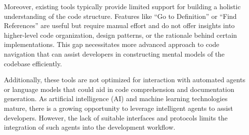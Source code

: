 \documentclass[12pt,oneside]{article}
\begin{document}
Moreover, existing tools typically provide limited support for building a holistic understanding of the code structure.
Features like “Go to Definition” or “Find References” are useful but require manual effort and do not offer insights 
into higher-level code organization, design patterns, or the rationale behind certain implementations. This gap necessitates 
\a more advanced approach to code navigation that can assist developers in constructing mental models of the codebase efficiently.

Additionally, these tools are not optimized for interaction with automated agents or language models that could aid in code
comprehension and documentation generation. As artificial intelligence (AI) and machine learning technologies mature, there 
is a growing opportunity to leverage intelligent agents to assist developers. However, the lack of suitable interfaces and 
protocols limits the integration of such agents into the development workflow.

\printbibliography%
\end{document}
